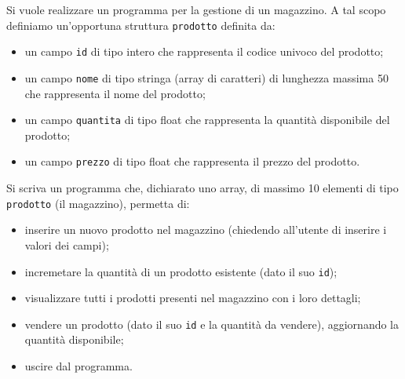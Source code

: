 \begin{Exercise}[label={ex:magazzino}]
    Si vuole realizzare un programma per la gestione di un magazzino.
    A tal scopo definiamo un'opportuna struttura \texttt{prodotto} definita da:
    \begin{itemize}
        \item un campo \texttt{id} di tipo intero che rappresenta il codice univoco del prodotto;
        \item un campo \texttt{nome} di tipo stringa (array di caratteri) di lunghezza massima 50 che rappresenta il nome del prodotto;
        \item un campo \texttt{quantita} di tipo float che rappresenta la quantità disponibile del prodotto;
        \item un campo \texttt{prezzo} di tipo float che rappresenta il prezzo del prodotto.
    \end{itemize}

    Si scriva un programma che, dichiarato uno array, di massimo 10 elementi di tipo \texttt{prodotto} (il magazzino), permetta di:
    \begin{itemize}
        \item inserire un nuovo prodotto nel magazzino (chiedendo all'utente di inserire i valori dei campi);
        \item incremetare la quantità di un prodotto esistente (dato il suo \texttt{id});
        \item visualizzare tutti i prodotti presenti nel magazzino con i loro dettagli;
        \item vendere un prodotto (dato il suo \texttt{id} e la quantità da vendere), aggiornando la quantità disponibile;
        \item uscire dal programma.
    \end{itemize}
\end{Exercise}

\begin{Answer}[ref={ex:magazzino}]
  	
\end{Answer}